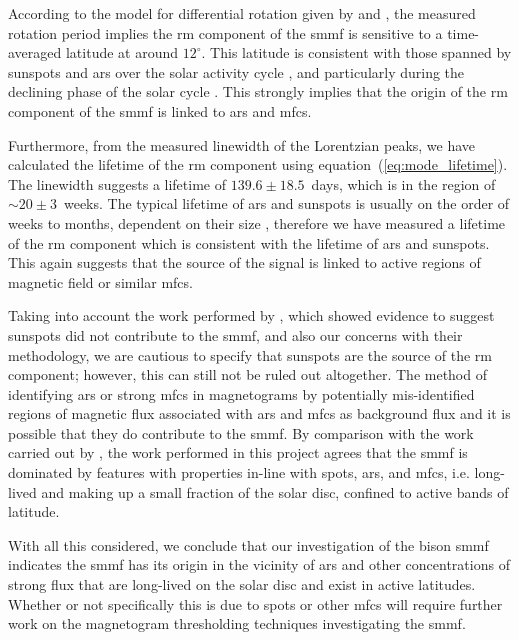 According to the model for differential rotation given by \citet{snodgrass_magnetic_1983} and \citet{brown_inferring_1989}, the measured rotation period implies the \gls{rm} component of the \gls{smmf} is sensitive to a time-averaged latitude at around $12^{\circ}$. This latitude is consistent with those spanned by sunspots and \glspl{ar} over the solar activity cycle \citep{maunder_note_1904, mcintosh_deciphering_2014}, and particularly during the declining phase of the solar cycle \citep{thomas_asteroseismic_2019}. This strongly implies that the origin of the \gls{rm} component of the \gls{smmf} is linked to \glspl{ar} and \glspl{mfc}.

Furthermore, from the measured linewidth of the Lorentzian peaks, we have calculated the lifetime of the \gls{rm} component using equation~(\ref{eq:mode_lifetime}). The linewidth suggests a lifetime of $139.6 \pm 18.5$~days, which is in the region of $\sim 20\pm3$~weeks. The typical lifetime of \glspl{ar} and sunspots is usually on the order of weeks to months, dependent on their size \citep{zwaan_solar_1981, schrijver_photospheric_1994, howard_sunspot_2001, hathaway_sunspot_2008, van_driel-gesztelyi_evolution_2015}, therefore we have measured a lifetime of the \gls{rm} component which is consistent with the lifetime of \glspl{ar} and sunspots. This again suggests that the source of the signal is linked to active regions of magnetic field or similar \glspl{mfc}.

Taking into account the work performed by \citet{bose_variability_2018}, which showed evidence to suggest sunspots did not contribute to the \gls{smmf}, and also our concerns with their methodology, we are cautious to specify that sunspots are the source of the \gls{rm} component; however, this can still not be ruled out altogether. The method of identifying \glspl{ar} or strong \glspl{mfc} in magnetograms by \citet{bose_variability_2018} potentially mis-identified regions of magnetic flux associated with \glspl{ar} and \glspl{mfc} as background flux and it is possible that they do contribute to the \gls{smmf}. By comparison with the work carried out by \citet{kutsenko_contribution_2017}, the work performed in this project agrees that the \gls{smmf} is dominated by features with properties in-line with spots, \glspl{ar}, and \glspl{mfc}, i.e. long-lived and making up a small fraction of the solar disc, confined to active bands of latitude.

With all this considered, we conclude that our investigation of the \gls{bison} \gls{smmf} indicates the \gls{smmf} has its origin in the vicinity of \glspl{ar} and other concentrations of strong flux that are long-lived on the solar disc and exist in active latitudes. Whether or not specifically this is due to spots or other \glspl{mfc} will require further work on the magnetogram thresholding techniques investigating the \gls{smmf}.


